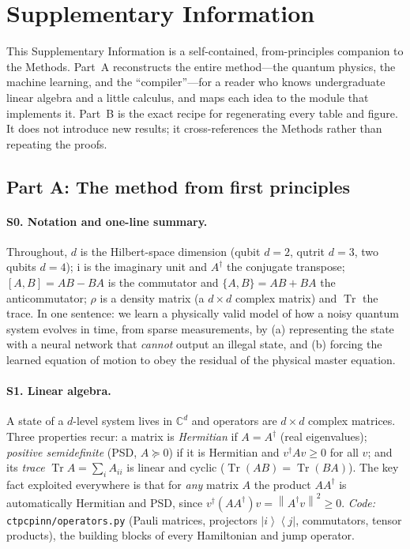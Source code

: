 \documentclass[11pt]{article}
\DeclareMathOperator{\Tr}{Tr}
\newcommand{\C}{\mathbb{C}}
\newcommand{\ii}{\mathrm{i}}
\newcommand{\norm}[1]{\left\lVert #1 \right\rVert}
\newcommand{\ket}[1]{\left\lvert #1 \right\rangle}
\newcommand{\bra}[1]{\left\langle #1 \right\rvert}
\begin{document}
\section*{Supplementary Information}
\label{sec:supplementary}

\sloppy

This Supplementary Information is a self-contained, from-principles companion to the Methods. Part~A reconstructs the entire method---the quantum physics, the machine learning, and the ``compiler''---for a reader who knows undergraduate linear algebra and a little calculus, and maps each idea to the module that implements it. Part~B is the exact recipe for regenerating every table and figure. It does not introduce new results; it cross-references the Methods rather than repeating the proofs.

\renewcommand{\thesubsection}{S\arabic{subsection}}
\setcounter{subsection}{0}

\subsection*{Part A: The method from first principles}

\paragraph{S0. Notation and one-line summary.}
Throughout, $d$ is the Hilbert-space dimension (qubit $d{=}2$, qutrit $d{=}3$, two qubits $d{=}4$); $\ii$ is the imaginary unit and $A^\dagger$ the conjugate transpose; $[A,B]=AB-BA$ is the commutator and $\{A,B\}=AB+BA$ the anticommutator; $\rho$ is a density matrix (a $d\times d$ complex matrix) and $\Tr$ the trace. In one sentence: we learn a physically valid model of how a noisy quantum system evolves in time, from sparse measurements, by (a) representing the state with a neural network that \emph{cannot} output an illegal state, and (b) forcing the learned equation of motion to obey the residual of the physical master equation.

\paragraph{S1. Linear algebra.}
A state of a $d$-level system lives in $\C^d$ and operators are $d\times d$ complex matrices. Three properties recur: a matrix is \emph{Hermitian} if $A=A^\dagger$ (real eigenvalues); \emph{positive semidefinite} (PSD, $A\succeq0$) if it is Hermitian and $v^\dagger A v\ge0$ for all $v$; and its \emph{trace} $\Tr A=\sum_i A_{ii}$ is linear and cyclic ($\Tr(AB)=\Tr(BA)$). The key fact exploited everywhere is that for \emph{any} matrix $A$ the product $AA^\dagger$ is automatically Hermitian and PSD, since $v^\dagger(AA^\dagger)v=\norm{A^\dagger v}^2\ge0$. \emph{Code:} \texttt{ctpcpinn/operators.py} (Pauli matrices, projectors $\ket{i}\!\bra{j}$, commutators, tensor products), the building blocks of every Hamiltonian and jump operator.
\end{document}
